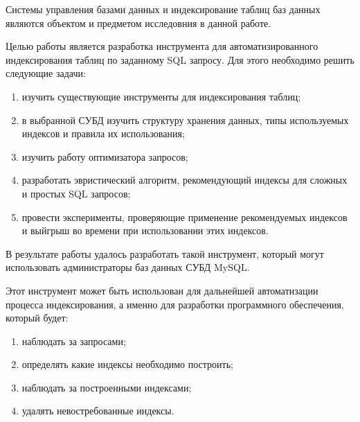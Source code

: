 \abstract

Системы управления базами данных и индексирование таблиц баз данных являются объектом и предметом исследовния в данной работе.  

Целью работы является разработка инструмента для автоматизированного индексирования таблиц по заданному SQL запросу. Для этого необходимо решить следующие задачи:

\begin{enumerate}
\item изучить существующие инструменты для индексирования таблиц;
\item в выбранной СУБД изучить структуру хранения данных, типы используемых индексов и правила их использования;
\item изучить работу оптимизатора запросов;
\item разработать эвристический алгоритм, рекомендующий индексы для сложных и простых SQL запросов;
\item провести эксперименты, проверяющие применение рекомендуемых индексов и выйгрыш во времени при использовании этих индексов.
\end{enumerate}

В результате работы удалось разработать такой инструмент, который могут использовать администраторы баз данных СУБД MySQL. 

Этот инструмент может быть использован для дальнейшей автоматизации процесса индексирования, а именно для разработки программного обеспечения, который будет:
\begin{enumerate}
\item наблюдать за запросами;
\item определять какие индексы необходимо построить;
\item наблюдать за построенными индексами;
\item удалять невостребованные индексы.
\end{enumerate}
